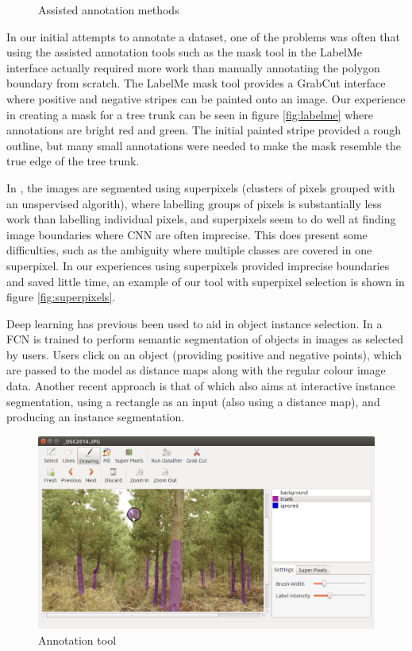 \documentclass{article}
\begin{document}
\begin{figure}[t]
\caption{Assisted annotation methods}
\label{fig:tree}
\end{figure}


In our initial attempts to annotate a dataset, one of the problems was often that using the assisted annotation tools such as the mask tool in the LabelMe \cite{Russell2007} interface actually required more work than manually annotating the polygon boundary from scratch. The LabelMe mask tool provides a GrabCut \cite{Rother2004} interface where positive and negative stripes can be painted onto an image. Our experience in creating a mask for a tree trunk can be seen in figure \ref{fig:labelme} where annotations are bright red and green. The initial painted stripe provided a rough outline, but many small annotations were needed to make the mask resemble the true edge of the tree trunk.

In \cite{Galloway2017}, the images are segmented using superpixels (clusters of pixels grouped with an unspervised algorith), where labelling groups of pixels is substantially less work than labelling individual pixels, and superpixels seem to do well at finding image boundaries where \gls{CNN} are often imprecise. This does present some difficulties, such as the ambiguity where multiple classes are covered in one superpixel. In our experiences using superpixels provided imprecise boundaries and saved little time, an example of our tool with superpixel selection is shown in figure \ref{fig:superpixels}.

Deep learning has previous been used to aid in object instance selection. In \cite{Xu2016} a \gls{FCN} is trained to perform semantic segmentation of objects in images as selected by users. Users click on an object (providing positive and negative points), which are passed to the model as distance maps along with the regular colour image data. Another recent approach is that of \cite{Xu2017} which also aims at interactive instance segmentation, using a rectangle as an input (also using a distance map), and producing an instance segmentation.



\begin{figure}[t]
  \centering
  \includegraphics[width=0.9\linewidth]{images/annotate.png}
  \caption{Annotation tool}  
  \label{fig:annotation}

\label{fig:tree}
\end{figure}
\end{document}
